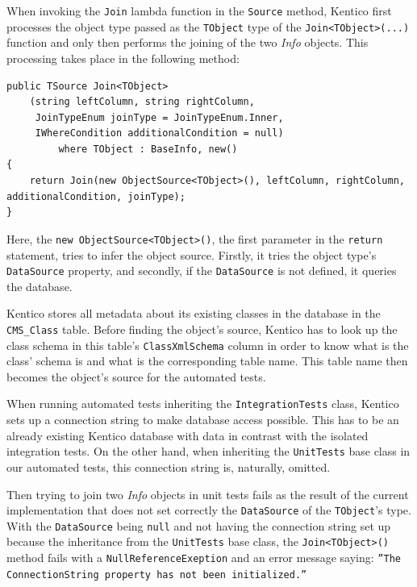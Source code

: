 \documentclass[
  print,
  table,
  nolof,
  nolot,
  nocover,
  oneside
]{fithesis3}
\begin{document}
When invoking the \texttt{Join} lambda function in the \texttt{Source} method, Kentico first processes the object type passed as the \texttt{TObject} type of the \texttt{Join<TObject>(...)} function and only then performs the joining of the two \textit{Info} objects. This processing takes place in the following method:
\begin{lstlisting}
public TSource Join<TObject>
    (string leftColumn, string rightColumn,
     JoinTypeEnum joinType = JoinTypeEnum.Inner,
     IWhereCondition additionalCondition = null)
         where TObject : BaseInfo, new()
{
    return Join(new ObjectSource<TObject>(), leftColumn, rightColumn, additionalCondition, joinType);
}
\end{lstlisting}

Here, the \texttt{new ObjectSource<TObject>()}, the first parameter in the \texttt{return} statement, tries to infer the object source. Firstly, it tries the object type's \texttt{DataSource} property, and secondly, if the \texttt{DataSource} is not defined, it queries the database.

Kentico stores all metadata about its existing classes in the database in the \texttt{CMS\_Class} table. Before finding the object's source, Kentico has to look up the class schema in this table's \texttt{ClassXmlSchema} column in order to know what is the class' schema is and what is the corresponding table name. This table name then becomes the object's source for the automated tests.

When running automated tests inheriting the \texttt{IntegrationTests} class, Kentico sets up a connection string to make database access possible. This has to be an already existing Kentico database with data in contrast with the isolated integration tests. On the other hand, when inheriting the \texttt{UnitTests} base class in our automated tests, this connection string is, naturally, omitted.

Then trying to join two \textit{Info} objects in unit tests fails as the result of the current implementation that does not set correctly the \texttt{DataSource} of the \texttt{TObject}'s type. With the \texttt{DataSource} being \texttt{null} and not having the connection string set up because the inheritance from the \texttt{UnitTests} base class, the \texttt{Join<TObject>()} method fails with a \texttt{NullReferenceExeption} and an error message saying: \texttt{''The ConnectionString property has not been initialized.''}
\end{document}

